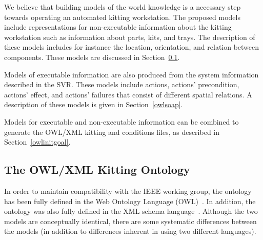 We believe that building models of the world knowledge is a necessary step towards operating an automated kitting workstation. The proposed models include representations for non-executable information about the kitting workstation such as information about parts, kits, and trays. The description of these models includes for instance the location, orientation, and relation between components. These models are discussed in Section~\ref{owlkitting}.

Models of executable information are also produced from the system information described in the SVR. These models include actions, actions' precondition, actions' effect, and actions' failures that consist of different spatial relations. A description of these models is given in Section~\ref{owlsoap}.

Models for executable and non-executable information can be combined to generate the OWL/XML kitting  and  conditions files, as described in Section~\ref{owlinitgoal}.

\subsection{The OWL/XML Kitting Ontology}\label{owlkitting}
In order to maintain compatibility with the IEEE working group, the  ontology has been fully defined in the Web Ontology Language (OWL)~\cite{OWLoverview}. In addition, the ontology was also fully defined in the XML schema language~\cite{Walmsley.2002}. Although the two models are conceptually identical, there are some systematic differences between the models (in addition to differences inherent in using two different languages).


